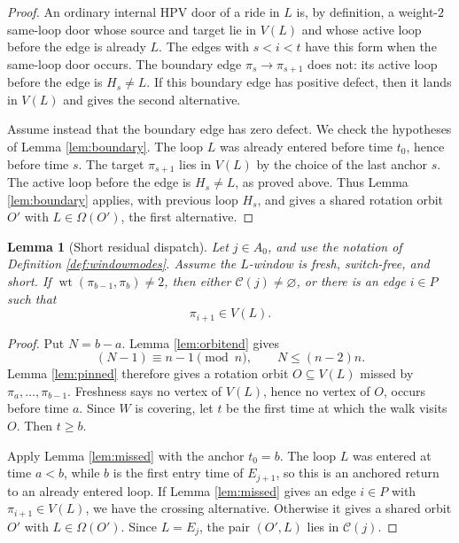 \documentclass[11pt]{article}
\newtheorem{lemma}[theorem]{Lemma}
\DeclareMathOperator{\wt}{wt}
\begin{document}
\begin{proof}
An ordinary internal HPV door of a ride in \(L\) is, by definition, a weight-\(2\) same-loop door
whose source and target lie in \(V(L)\) and whose active loop before the edge is already \(L\).
The edges with \(s<i<t\) have this form when the same-loop door occurs.  The boundary edge
\(\pi_s\to\pi_{s+1}\) does not: its active loop before the edge is \(H_s\ne L\).  If this boundary
edge has positive defect, then it lands in \(V(L)\) and gives the second alternative.

Assume instead that the boundary edge has zero defect.  We check the hypotheses of Lemma
\ref{lem:boundary}.  The loop \(L\) was already entered before time \(t_0\), hence before time
\(s\).  The target \(\pi_{s+1}\) lies in \(V(L)\) by the choice of the last anchor \(s\).  The
active loop before the edge is \(H_s\ne L\), as proved above.  Thus Lemma
\ref{lem:boundary} applies, with previous loop \(H_s\),
and gives a shared rotation orbit \(O'\) with \(L\in\Omega(O')\), the first alternative.
\end{proof}

\begin{lemma}[Short residual dispatch]\label{lem:shortresidual}
Let \(j\in A_0\), and use the notation of Definition \ref{def:windowmodes}.  Assume the
\(L\)-window is fresh, switch-free, and short.  If \(\wt(\pi_{b-1},\pi_b)\ne2\), then either
\(\mathcal C(j)\ne\varnothing\), or there is an edge \(i\in P\) such that
\[
  \pi_{i+1}\in V(L).
\]
\end{lemma}

\begin{proof}
Put \(N=b-a\).  Lemma \ref{lem:orbitend} gives
\[
  (N-1)\equiv n-1\pmod n,\qquad N\le(n-2)n.
\]
Lemma \ref{lem:pinned} therefore gives a rotation orbit \(O\subseteq V(L)\) missed by
\(\pi_a,\ldots,\pi_{b-1}\).  Freshness says no vertex of \(V(L)\), hence no vertex of \(O\), occurs
before time \(a\).  Since \(W\) is covering, let \(t\) be the first time at which the walk visits
\(O\).  Then \(t\ge b\).

Apply Lemma \ref{lem:missed} with the anchor \(t_0=b\).  The loop \(L\) was entered at time
\(a<b\), while \(b\) is the first entry time of \(E_{j+1}\), so this is an anchored return to an
already entered loop.  If Lemma \ref{lem:missed} gives an edge \(i\in P\) with
\(\pi_{i+1}\in V(L)\), we have the crossing alternative.  Otherwise it gives a shared orbit
\(O'\) with \(L\in\Omega(O')\).  Since \(L=E_j\), the pair \((O',L)\) lies in \(\mathcal C(j)\).
\end{proof}
\end{document}
